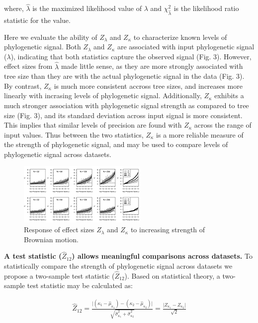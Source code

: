 \documentclass[9pt,twocolumn,twoside,lineno]{pnas-new}
\begin{document}
where, \(\hat{\lambda}\) is the maximized likelihood value of
\(\lambda\) and \(\chi^{2}_{\hat{\lambda}}\) is the likelihood ratio
statistic for the value.

Here we evaluate the ability of \(Z_{\lambda}\) and \(Z_{\kappa}\) to
characterize known levels of phylogenetic signal. Both \(Z_{\lambda}\)
and \(Z_{\kappa}\) are associated with input phylogenetic signal
(\(\lambda\)), indicating that both statistics capture the observed
signal (Fig. 3). However, effect sizes from \(\hat{\lambda}\) made
little sense, as they are more strongly associated with tree size than
they are with the actual phylogenetic signal in the data (Fig. 3). By
contrast, \(Z_{\kappa}\) is much more consistent accross tree sizes, and
increases more linearly with incrasing levels of phylogenetic signal.
Additionally, \(Z_{\kappa}\) exhibits a much stronger association with
phylogenetic signal strength as compared to tree size (Fig. 3), and its
standard deviation across input signal is more consistent. This implies
that similar levels of precision are found with \(Z_{\kappa}\) across
the range of input values. Thus between the two statistics,
\(Z_{\kappa}\) is a more reliable measure of the strength of
phylogenetic signal, and may be used to compare levels of phylogenetic
signal across datasets.

\begin{figure}
\centering
\includegraphics{new.fig.3.temp.png}
\caption{Response of effect sizes \(Z_{\lambda}\) and \(Z_{\kappa}\) to
increasing strength of Brownian motion.{}}
\end{figure}

\textbf{A test statistic (\(\hat{Z}_{12}\)) allows meaningful
comparisons across datasets.} To statistically compare the strength of
phylogenetic signal across datasets we propose a two-sample test
statistic (\(\hat{Z}_{12}\)). Based on statistical theory, a two-sample
test statistic may be calculated as:

\begin{align}
  \hat{Z}_{12}=\frac{\lvert{(\kappa_{1}-\hat\mu_{\kappa_1})-(\kappa_{2}-\hat\mu_{\kappa_2})}\rvert}{\sqrt{\hat\sigma^2_{\kappa_1}+\hat\sigma^2_{\kappa_2}}} = \frac{\lvert Z_{\kappa_1} - Z_{\kappa_2}\rvert}{\sqrt{2}}
\end{align}
\end{document}

